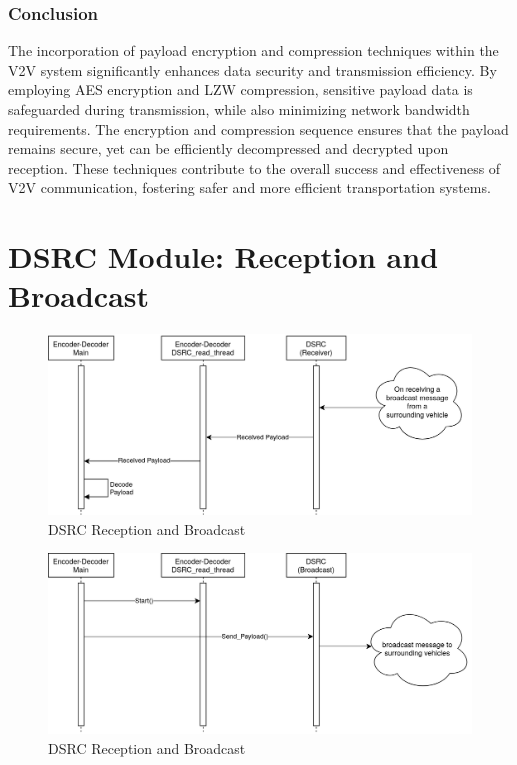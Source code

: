 \documentclass[
12pt,
oneside, 
onehalfspacing, 
nolistspacing, 
parskip, 
chapterinoneline, 
]{AASTCOMPUTER}
\begin{document}
\subsubsection{Conclusion}
The incorporation of payload encryption and compression techniques within the V2V system significantly enhances data security and transmission efficiency. By employing AES encryption and LZW compression, sensitive payload data is safeguarded during transmission, while also minimizing network bandwidth requirements. The encryption and compression sequence ensures that the payload remains secure, yet can be efficiently decompressed and decrypted upon reception. These techniques contribute to the overall success and effectiveness of V2V communication, fostering safer and more efficient transportation systems.

\section{DSRC Module: Reception and Broadcast}
\begin{figure}[!ht]
\centering
\includegraphics[scale=0.4]{Figures/ReceptionandBroadcast.png}
\caption[DSRC Reception and Broadcast]{DSRC Reception and Broadcast}
\label{fig:DSRC Reception and Broadcast1}
\end{figure}

\clearpage

\begin{figure}[!ht]
\centering
\includegraphics[scale=0.4]{Figures/ReceptionandBroadcast(2).png}
\caption[ReceptionandBroadcast]{DSRC Reception and Broadcast}
\label{fig:DSRC Reception and Broadcast2}
\end{figure}
\end{document}
